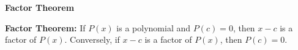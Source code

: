 \begin{center}
\textbf{Factor Theorem 
}
\end{center}

\vspce 

\textbf{Factor Theorem:} If  $P(x) $ is a polynomial and $P(c)=0$, then $x-c$ is a factor of $P(x) $. Conversely, if $x-c$ is a factor of $P(x) $, then $P(c)=0$. 


